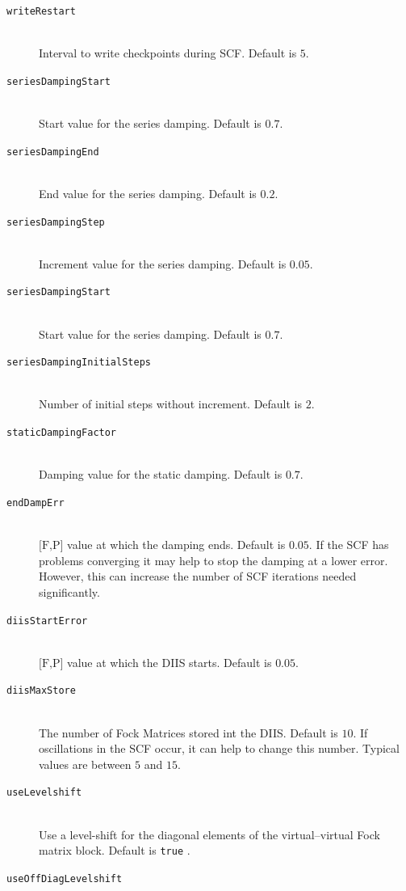 \documentclass[bibliography=totocnumbered,a4paper,10pt,oneside]{scrbook}
\newcommand{\ttt}[1]{%
  \begingroup\setlength{\fboxsep}{1pt}%
  \colorbox{serenity-green!30}{\texttt{\hspace*{2pt}\vphantom{(g}#1\hspace*{2pt}}}%
  \endgroup
}
\begin{document}
\begin{description}
    \item [\texttt{writeRestart}]\hfill \\
    Interval to write checkpoints during SCF. Default is $5$.
   \item [\texttt{seriesDampingStart}]\hfill \\
    Start value for the series damping. Default is $0.7$.
    \item [\texttt{seriesDampingEnd}]\hfill \\
    End value for the series damping. Default is $0.2$.
    \item [\texttt{seriesDampingStep}]\hfill \\
    Increment value for the series damping. Default is $0.05$.
    \item [\texttt{seriesDampingStart}]\hfill \\
    Start value for the series damping. Default is $0.7$.
    \item [\texttt{seriesDampingInitialSteps}]\hfill \\
    Number of initial steps without increment. Default is $2$.
    \item [\texttt{staticDampingFactor}]\hfill \\
    Damping value for the static damping. Default is $0.7$.
    \item [\texttt{endDampErr}]\hfill \\
    $\text{[F,P]}$ value at which the damping ends. Default is $0.05$.
    If the SCF has problems converging it may help to stop the damping at a lower error. However, this can
    increase the number of SCF iterations needed significantly.
    \item [\texttt{diisStartError}]\hfill \\
    $\text{[F,P]}$ value at which the DIIS starts. Default is $0.05$.
    \item [\texttt{diisMaxStore}]\hfill \\
    The number of Fock Matrices stored int the DIIS. Default is $10$. If oscillations in the SCF occur, it can
    help to change this number. Typical values are between $5$ and $15$.
    \item [\texttt{useLevelshift}]\hfill \\
    Use a level-shift for the diagonal elements of the virtual--virtual Fock matrix block. Default is \ttt{true}.
    \item [\texttt{useOffDiagLevelshift}]\hfill \\

\end{description}
\end{document}
